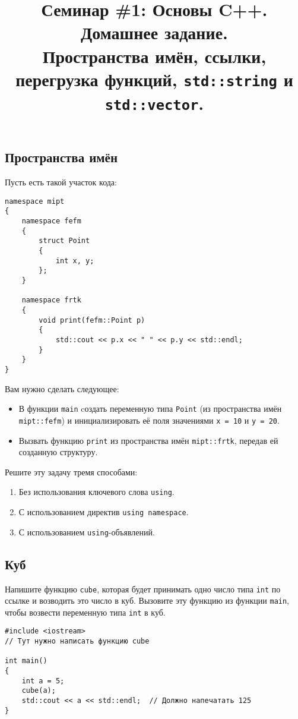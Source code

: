 \documentclass{article}
\begin{document}
\title{Семинар \#1: Основы C++. Домашнее задание. \\[1ex] \large Пространства имён, ссылки, перегрузка функций, \texttt{std::string} и \texttt{std::vector}. \vspace{-5ex}}\date{}\maketitle

\subsection{Пространства имён}
Пусть есть такой участок кода:
\begin{lstlisting}
namespace mipt
{
	namespace fefm
	{
		struct Point
		{
			int x, y;
		};
	}
	
	namespace frtk
	{
		void print(fefm::Point p)
		{
			std::cout << p.x << " " << p.y << std::endl;
		}
	}
}
\end{lstlisting}
Вам нужно сделать следующее:
\begin{itemize}
\item В функции \texttt{main} cоздать переменную типа \texttt{Point} (из пространства имён \texttt{mipt::fefm}) и инициализировать её поля значениями \texttt{x = 10} и \texttt{y = 20}.
\item Вызвать функцию \texttt{print} из пространства имён \texttt{mipt::frtk}, передав ей созданную структуру.
\end{itemize}
Решите эту задачу тремя способами:
\begin{enumerate}
\item Без использования ключевого слова \texttt{using}.
\item С использованием директив \texttt{using namespace}.
\item С использованием \texttt{using}-объявлений.
\end{enumerate}

\subsection{Куб}
Напишите функцию \texttt{cube}, которая будет принимать одно число типа \texttt{int} по ссылке и возводить это число в куб. Вызовите эту функцию из функции \texttt{main}, чтобы возвести переменную типа \texttt{int} в куб.
\begin{lstlisting}
#include <iostream>
// Тут нужно написать функцию cube

int main()
{
	int a = 5;
	cube(a);
	std::cout << a << std::endl;  // Должно напечатать 125
}
\end{lstlisting}
\end{document}
